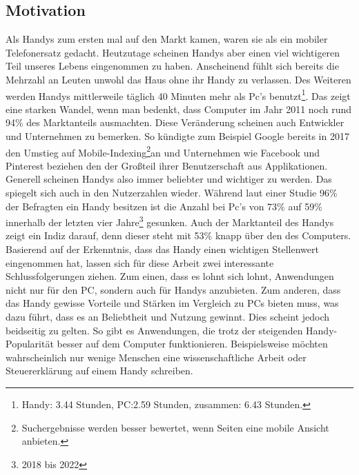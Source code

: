 \subsection{Motivation}\label{subsection:motivation}
%
Als Handys zum ersten mal auf den Markt kamen, waren sie als ein mobiler Telefonersatz gedacht. Heutzutage scheinen Handys aber einen viel wichtigeren Teil unseres Lebens eingenommen zu haben. Anscheinend fühlt sich bereits die Mehrzahl an Leuten unwohl das Haus ohne ihr Handy zu verlassen\cite{pcVsphone_feelingUneasyWhenLeavingPhoneHome}. Des Weiteren werden Handys mittlerweile täglich 40 Minuten mehr als Pc's benutzt\cite{pcVsphone_phoneScreenTime,pcVsphone_totalScreenTime,pcVsphone_totalScreenTime2}\footnote{Handy: 3.44 Stunden, PC:2.59 Stunden, zusammen: 6.43 Stunden.}. Das zeigt eine starken Wandel, wenn man bedenkt, dass Computer im Jahr 2011 noch rund 94\% des Marktanteils ausmachten\cite{pcVsphone_smartphoneWebTrafficHigherThanPc}. Diese Veränderung scheinen auch Entwickler und Unternehmen zu bemerken. So kündigte zum Beispiel Google bereits in 2017 den Umstieg auf Mobile-Indexing\footnote{Suchergebnisse werden besser bewertet, wenn Seiten eine mobile Ansicht anbieten.}an\cite{pcVsphone_mobileFirstIndexing} und Unternehmen wie Facebook und Pinterest beziehen den der Großteil ihrer Benutzerschaft aus Applikationen\cite{pcVsphone_socialMediaFacebookMobileUsage,pcVsphone_socialMediaPinterestMobileUsage}.\newline%
Generell scheinen Handys also immer beliebter und wichtiger zu werden. Das spiegelt sich auch in den Nutzerzahlen wieder. Während laut einer Studie 96\% der Befragten ein Handy besitzen ist die Anzahl bei Pc's von 73\% auf 59\% innerhalb der letzten vier Jahre\footnote{2018 bis 2022} gesunken\cite{pcVsphone_deviceOwnership}. Auch der Marktanteil des Handys zeigt ein Indiz darauf, denn dieser steht mit 53\% knapp über den des Computers\cite{pcVsphone_smartphoneWebTrafficHigherThanPc}.%
%
\newline
\myNewSection%
Basierend auf der Erkenntnis, dass das Handy einen wichtigen Stellenwert eingenommen hat, lassen sich für diese Arbeit zwei interessante Schlussfolgerungen ziehen.\newline
Zum einen, dass es lohnt sich lohnt, Anwendungen nicht nur für den PC, sondern auch für Handys anzubieten.\newline%
Zum anderen, dass das Handy gewisse Vorteile und Stärken im Vergleich zu PCs bieten muss, was dazu führt, dass es an Beliebtheit und Nutzung gewinnt. Dies scheint jedoch beidseitig zu gelten. So gibt es Anwendungen, die trotz der steigenden Handy-Popularität besser auf dem Computer funktionieren. Beispielsweise möchten wahrscheinlich nur wenige Menschen eine wissenschaftliche Arbeit oder Steuererklärung auf einem Handy schreiben.%
